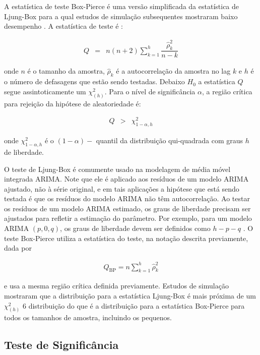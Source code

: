 A estatística de teste Box-Pierce é uma versão simplificada da estatística de Ljung-Box para a qual estudos de simulação subsequentes mostraram baixo desempenho \cite{dav}. A estatística de teste é \cite{ljung}:
 
 \begin{eqnarray}
 	Q&=&n(n+2) \sum_{k=1}^h \dfrac{\hat{\rho}_k^2}{n-k}
 \end{eqnarray}
 
\noindent onde $n$ é o tamanho da amostra, $\hat{\rho}_k$ é a autocorrelação da amostra no lag $k$ e $h$ é o número de defasagens que estão sendo testadas. Debaixo $H_0$ a estatística $Q$ segue assintoticamente um $\chi_{(h)}^2$. Para o nível de significância $\alpha$, a região crítica para rejeição da hipótese de aleatoriedade é:
 
\begin{eqnarray}
 	Q&>&\chi_{1-\alpha, h}^2
\end{eqnarray}
 
\noindent onde $\chi_{1-\alpha, h}^2$ é o $(1-\alpha)-$ quantil \cite{Brockwell2002} da distribuição qui-quadrada com graus $h$ de liberdade.
 
O teste de Ljung-Box é comumente usado na modelagem de média móvel integrada ARIMA. Note que ele é aplicado aos resíduos de um modelo ARIMA ajustado, não à série original, e em tais aplicações a hipótese que está sendo testada é que os resíduos do modelo ARIMA não têm autocorrelação. Ao testar os resíduos de um modelo ARIMA estimado, os graus de liberdade precisam ser ajustados para refletir a estimação do parâmetro. Por exemplo, para um modelo ARIMA $(p,0,q)$, os graus de liberdade devem ser definidos como $h-p-q$ \cite{Davidson2000}. O teste Box-Pierce utiliza a estatística do teste, na notação descrita previamente, dada por \cite{box}
 
 \begin{eqnarray}
 	Q_{\mathrm{BP}}=n \sum_{k=1}^h \hat{\rho}_k^2
 \end{eqnarray}
 
\noindent e usa a mesma região crítica definida previamente.
Estudos de simulação mostraram que a distribuição para a estatística Ljung-Box é mais próxima de um $\chi^2_{(h)}$ $6$ distribuição do que é a distribuição para a estatística Box-Pierce para todos os tamanhos de amostra, incluindo os pequenos.
 
 
\subsection{Teste de Signific\^ancia}
 
